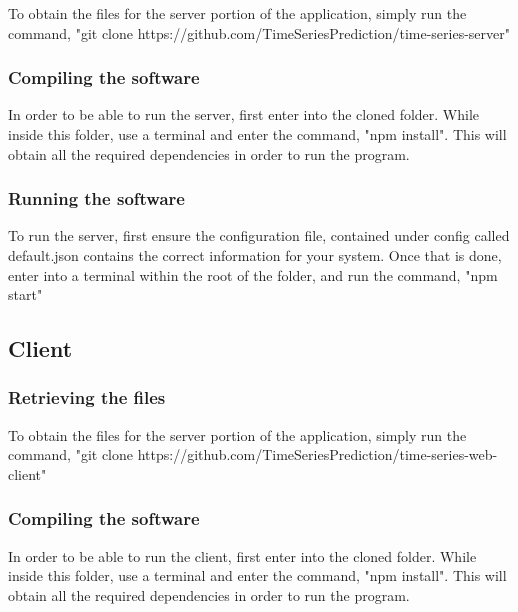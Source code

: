 \documentclass[a4paper,12pt]{article}
\begin{document}
	    	To obtain the files for the server portion of the application, simply run the command, "git clone https://github.com/TimeSeriesPrediction/time-series-server"
   	    		
	     	\subsubsection {Compiling the software}
	     	
	     	In order to be able to run the server, first enter into the cloned folder. While inside this folder, use a terminal and enter the command, "npm install". This will obtain all the required dependencies in order to run the program.
	     	
	     	\subsubsection {Running the software}
	     	
	     	To run the server, first ensure the configuration file, contained under config called default.json contains the correct information for your system. Once that is done, enter into a terminal within the root of the folder, and run the command, "npm start"
     
     	\subsection{Client}
     	
     		\subsubsection {Retrieving the files}
     		
     		To obtain the files for the server portion of the application, simply run the command, "git clone https://github.com/TimeSeriesPrediction/time-series-web-client"
     		
     		\subsubsection {Compiling the software}
     				
     		In order to be able to run the client, first enter into the cloned folder. While inside this folder, use a terminal and enter the command, "npm install". This will obtain all the required dependencies in order to run the program.
     		
\end{document}
